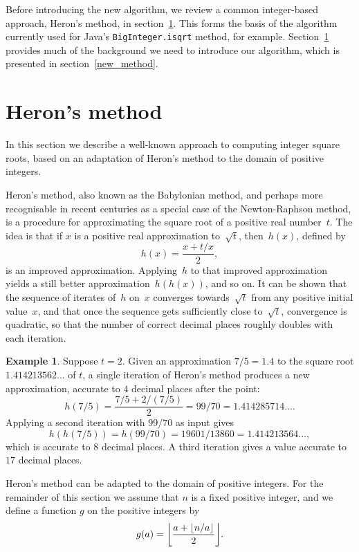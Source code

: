 \documentclass[a4paper]{article}
\DeclarePairedDelimiter\floor{\lfloor}{\rfloor}
\theoremstyle{plain}
\theoremstyle{definition}
\newtheorem{example}[theorem]{Example}
\begin{document}
Before introducing the new algorithm, we review a common integer-based
approach, Heron's method, in section~\ref{old_method}. This forms the basis of
the algorithm currently used for Java's \lstinline{BigInteger.isqrt} method,
for example. Section~\ref{old_method} provides much of the background we need
to introduce our algorithm, which is presented in section~\ref{new_method}.

\section{Heron's method}
\label{old_method}

In this section we describe a well-known approach to computing integer square
roots, based on an adaptation of Heron's method to the domain of positive
integers.

Heron's method, also known as the Babylonian method, and perhaps more
recognisable in recent centuries as a special case of the Newton-Raphson
method, is a procedure for approximating the square root of a positive
real number~$t$. The idea is that if $x$ is a positive real
approximation to~$\sqrt t$, then~$h(x)$, defined by
$$h(x) = \frac{x + t/x}2,$$ is an improved approximation. Applying~$h$ to that
improved approximation yields a still better approximation~$h(h(x))$, and so
on. It can be shown that the sequence of iterates of~$h$ on~$x$ converges
towards~$\sqrt t$ from any positive initial value~$x$, and that once the
sequence gets sufficiently close to~$\sqrt t$, convergence is quadratic, so
that the number of correct decimal places roughly doubles with each iteration.

\begin{example}
  Suppose $t=2$. Given an approximation $7/5 = 1.4$ to the square root
  $1.414213562\dots$ of $t$, a single iteration of Heron's method produces a
  new approximation, accurate to $4$ decimal places after the point:
  $$h(7/5) = \frac{7/5 + 2/(7/5)}2 = 99/70 = 1.414285714\dots.$$ Applying a
  second iteration with $99/70$ as input gives
  $$h(h(7/5)) = h(99/70) = 19601/13860 =
  1.414213564\dots,$$ which is accurate to $8$ decimal places. A third
  iteration gives a value accurate to $17$ decimal places.
\end{example}

Heron's method can be adapted to the domain of positive integers. For the
remainder of this section we assume that $n$ is a fixed positive integer, and
we define a function $g$ on the positive integers by
$$g(a) = \floor*{\frac{a + \floor{n/a}}2}.$$
\end{document}
